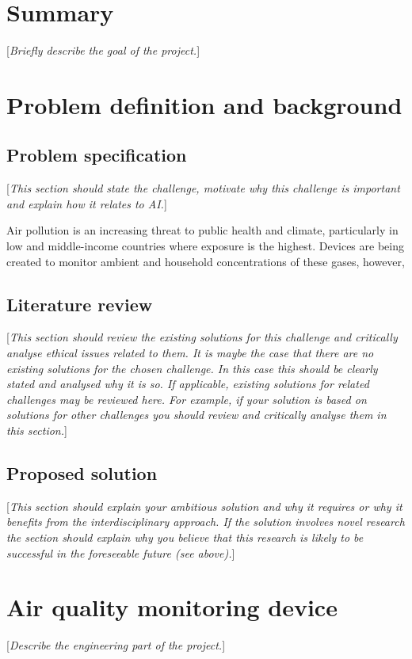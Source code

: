 \documentclass[10pt,english, openany]{book}
\begin{document}
\chapter{Summary}\label{chapt:sum}
[\textit{Briefly describe the goal of the project.}]

\chapter{Problem definition and background}
\section{Problem specification}
[\textit{This section should state the challenge, motivate why this challenge is important and explain how it relates to AI.}]

Air pollution is an increasing threat to public health and climate, particularly in low and middle-income countries where exposure is the highest. Devices are being created to monitor ambient and household concentrations of these gases, however, 

\section{Literature review}
[\textit{This section should review the existing solutions for this challenge and critically analyse ethical issues related to them. It is maybe the case that there are no existing solutions for the chosen challenge. In this case this should be clearly stated and analysed why it is so. If applicable, existing solutions for related challenges may be reviewed here. For example, if your solution is based on solutions for other challenges you should review and critically analyse them in this section.}]

\section{Proposed solution}
[\textit{This section should explain your ambitious solution and why it requires or why it benefits from the interdisciplinary approach. If the solution involves novel research the section should explain why you believe that this research is likely to be successful in the foreseeable future (see above).}]

\chapter{Air quality monitoring device}\label{chapt:doe}
[\textit{Describe the engineering part of the project.}]
\end{document}
